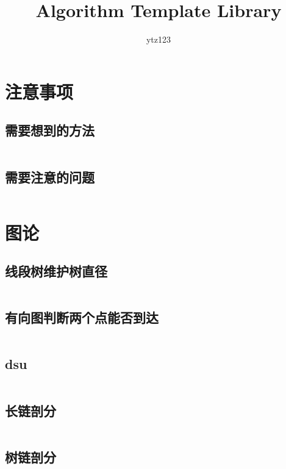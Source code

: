 \documentclass{article}
\author{ytz123}
\title{Algorithm Template Library}
\begin{document}
 
\maketitle %
\newpage %
\tableofcontents %

\newpage
\section{注意事项} %
\subsection{需要想到的方法} %
\inputminted[breaklines]{text}{../注意事项/需要想到的方法.txt}

\subsection{需要注意的问题} %
\inputminted[breaklines]{text}{../注意事项/需要注意的问题.txt}

\newpage
\section{图论} %

\subsection{线段树维护树直径} %
\inputminted[breaklines]{c++}{../图论/线段树维护树直径.cpp} %

\subsection{有向图判断两个点能否到达} %
\inputminted[breaklines]{c++}{../图论/有向图判断两个点能否到达.cpp} %

\subsection{dsu} %
\inputminted[breaklines]{c++}{../图论/dsu.cpp} %

\subsection{长链剖分} %
\inputminted[breaklines]{c++}{../图论/长链剖分.cpp} %

\subsection{树链剖分} %
\inputminted[breaklines]{c++}{../图论/树链剖分.cpp} %
\end{document}
